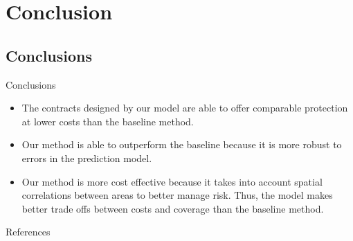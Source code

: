 \documentclass{beamer}
\begin{document}
\section{Conclusion}
\subsection{Conclusions}
\begin{frame}{Conclusions}
    \begin{itemize}
    \setlength\itemsep{2em}
        \item The contracts designed by our model are able to offer comparable protection at lower costs than the baseline method. 
        \item Our method is able to outperform the baseline because it is more robust to errors in the prediction model. 
        \item Our method is more cost effective because it takes into account spatial correlations between areas to better manage risk. Thus, the model makes better trade offs between costs and coverage than the baseline method. 
    \end{itemize}
\end{frame}


\begin{frame}{References}
\footnotesize
\printbibliography
\end{frame}
\end{document}
